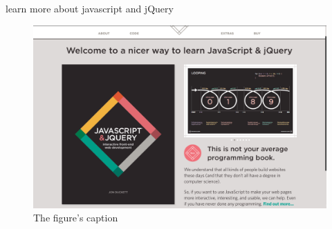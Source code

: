 \documentclass[14pt,aspectratio=169]{beamer}
\begin{document}
%
\begin{frame}{learn more about javascript and jQuery}
  \begin{figure}
    \centering
    \includegraphics[scale=.085]{images/javascript-book.png}
    \caption{The figure's caption}
  \end{figure}
\end{frame}
\end{document}
